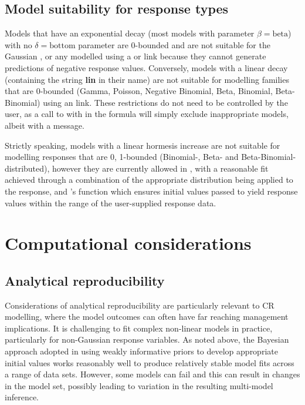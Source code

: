 \documentclass[
  shortnames]{jss}
\begin{document}
\hypertarget{model-suitability-for-response-types}{%
\subsection{Model suitability for response types}\label{model-suitability-for-response-types}}

Models that have an exponential decay (most models with parameter \(\beta = \text{beta}\)) with no \(\delta = \text{bottom}\) parameter are 0-bounded and are not suitable for the Gaussian , or any  modelled using a  or  link because they cannot generate predictions of negative response values. Conversely, models with a linear decay (containing the string \textbf{lin} in their name) are not suitable for modelling families that are 0-bounded (Gamma, Poisson, Negative Binomial, Beta, Binomial, Beta-Binomial) using an  link. These restrictions do not need to be controlled by the user, as a call to  with  in the formula will simply exclude inappropriate models, albeit with a message.

Strictly speaking, models with a linear hormesis increase are not suitable for modelling responses that are 0, 1-bounded (Binomial-, Beta- and Beta-Binomial-distributed), however they are currently allowed in , with a reasonable fit achieved through a combination of the appropriate distribution being applied to the response, and 's  function which ensures initial values passed to  yield response values within the range of the user-supplied response data.

\section[Computational considerations]{Computational considerations}\label{comptime}

\hypertarget{analytical-reproducibility}{%
\subsection{Analytical reproducibility}\label{analytical-reproducibility}}

Considerations of analytical reproducibility are particularly relevant to CR modelling, where the model outcomes can often have far reaching management implications. It is challenging to fit complex non-linear models in practice, particularly for non-Gaussian response variables. As noted above, the Bayesian approach adopted in  using weakly informative priors to develop appropriate initial values works reasonably well to produce relatively stable model fits across a range of data sets. However, some models can fail and this can result in changes in the model set, possibly leading to variation in the resulting multi-model inference.
\end{document}
